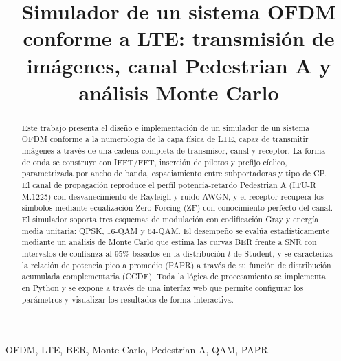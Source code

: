 \documentclass[conference,onecolumn]{IEEEtran}
\begin{document}
\title{Simulador de un sistema OFDM conforme a LTE: transmisi\'on de im\'agenes, canal Pedestrian A y an\'alisis Monte Carlo}

\author{
\and
{}
}

\maketitle

\begin{abstract}
Este trabajo presenta el dise\~no e implementaci\'on de un simulador de un sistema OFDM conforme a la numerolog\'ia de la capa f\'isica de LTE, capaz de transmitir im\'agenes a trav\'es de una cadena completa de transmisor, canal y receptor. La forma de onda se construye con IFFT/FFT, inserci\'on de pilotos y prefijo c\'iclico, parametrizada por ancho de banda, espaciamiento entre subportadoras y tipo de CP. El canal de propagaci\'on reproduce el perfil potencia-retardo Pedestrian A (ITU-R M.1225) con desvanecimiento de Rayleigh y ruido AWGN, y el receptor recupera los s\'imbolos mediante ecualizaci\'on Zero-Forcing (ZF) con conocimiento perfecto del canal. El simulador soporta tres esquemas de modulaci\'on con codificaci\'on Gray y energ\'ia media unitaria: QPSK, 16-QAM y 64-QAM. El desempe\~no se eval\'ua estad\'isticamente mediante un an\'alisis de Monte Carlo que estima las curvas BER frente a SNR con intervalos de confianza al $95\%$ basados en la distribuci\'on $t$ de Student, y se caracteriza la relaci\'on de potencia pico a promedio (PAPR) a trav\'es de su funci\'on de distribuci\'on acumulada complementaria (CCDF). Toda la l\'ogica de procesamiento se implementa en Python y se expone a trav\'es de una interfaz web que permite configurar los par\'ametros y visualizar los resultados de forma interactiva.
\end{abstract}

\begin{IEEEkeywords}
OFDM, LTE, BER, Monte Carlo, Pedestrian A, QAM, PAPR.
\end{IEEEkeywords}
\end{document}
